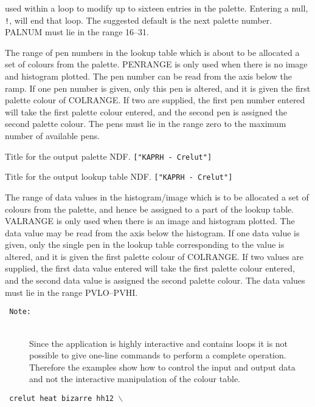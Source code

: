\documentclass[twoside,11pt]{article}
\newcommand{\htmlref}[2]{#1}
\newcommand{\sstexamples}[1]{
   \goodbreak
   \item[Examples:] \mbox{} \\
   \vspace{-3.5ex}
   \begin{description}
      #1
   \end{description}
}
\newcommand{\sstsubsection}[1]{ \item[{#1}] \mbox{} \\}
\newcommand{\sstexamplesubsection}[2]{\sloppy \item{\ssttt #1} \mbox{} \\ #2 }
\newcommand{\ssttt}{\tt}
\renewcommand{\sstexamples}[1]{
      \htmlref{\item[Examples:]}{ap:example}
      \begin{description}
         #1
      \end{description}
   }
\renewcommand{\sstsubsection}[1]{\item[{#1}]}
\renewcommand{\sstexamplesubsection}[2]{\item[{\ssttt #1}] \\ #2}
\begin{document}
{{{         used within a loop to modify up to sixteen entries in the
         palette.  Entering a null, {\tt !}, will end that loop.  The
         suggested default is the next palette number.  PALNUM must lie
         in the range 16--31.
      }
      \sstsubsection{
         PENRANGE() = \_INTEGER (Read)
      }{
         The range of pen numbers in the lookup table which is about to
         be allocated a set of colours from the palette.  PENRANGE is
         only used when there is no image and histogram plotted.  The
         pen number can be read from the axis below the ramp.  If one
         pen number is given, only this pen is altered, and it is given
         the first palette colour of COLRANGE.  If two are supplied,
         the first pen number entered will take the first palette
         colour entered, and the second pen is assigned the second
         palette colour.  The pens must lie in the range zero to the
         maximum number of available pens.
      }
      \sstsubsection{
         PTITLE = LITERAL (Read)
      }{
         Title for the output palette NDF. {\tt ["KAPRH - Crelut"]}
      }
      \sstsubsection{
         TITLE = LITERAL (Read)
      }{
         Title for the output lookup table NDF. {\tt ["KAPRH - Crelut"]}
      }
      \sstsubsection{
         VALRANGE() = \_DOUBLE (Read)
      }{
         The range of data values in the histogram/image which is to
         be allocated a set of colours from the palette, and hence be
         assigned to a part of the lookup table.  VALRANGE is only used
         when there is an image and histogram plotted.  The data value
         may be read from the axis below the histogram.  If one data
         value is given, only the single pen in the lookup table
         corresponding to the value is altered, and it is given the
         first palette colour of COLRANGE.  If two values are supplied,
         the first data value entered will take the first palette
         colour entered, and the second data value is assigned the
         second palette colour.  The data values must lie in the range
         PVLO--PVHI.
      }
   }
   \sstexamples{
      \sstexamplesubsection{
         Note:
      }{
         Since the application is highly interactive and contains loops
         it is not possible to give one-line commands to perform a
         complete operation.  Therefore the examples show how to
         control the input and output data and not the interactive
         manipulation of the colour table.
      }
      \sstexamplesubsection{
         crelut heat bizarre hh12 $\backslash$
}}}
\end{document}
